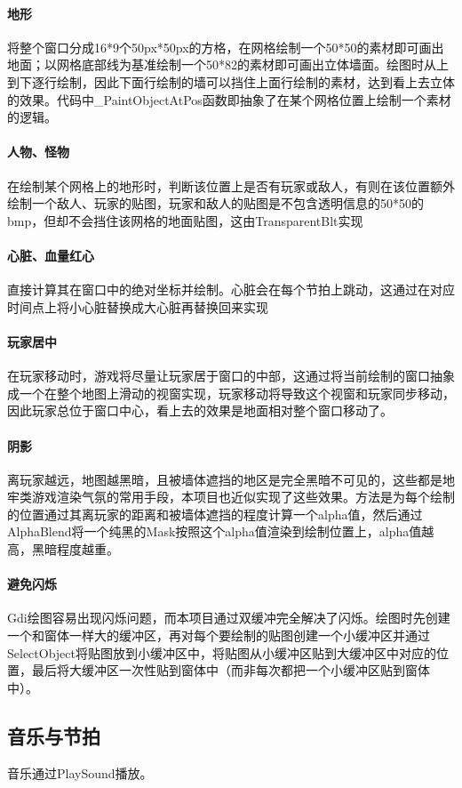 \documentclass[11pt,a4paper]{article}	%
\begin{document}
\paragraph{地形}将整个窗口分成16*9个50px*50px的方格，在网格绘制一个50*50的素材即可画出地面；以网格底部线为基准绘制一个50*82的素材即可画出立体墙面。绘图时从上到下逐行绘制，因此下面行绘制的墙可以挡住上面行绘制的素材，达到看上去立体的效果。代码中\_PaintObjectAtPos函数即抽象了在某个网格位置上绘制一个素材的逻辑。
\paragraph{人物、怪物}在绘制某个网格上的地形时，判断该位置上是否有玩家或敌人，有则在该位置额外绘制一个敌人、玩家的贴图，玩家和敌人的贴图是不包含透明信息的50*50的bmp，但却不会挡住该网格的地面贴图，这由TransparentBlt实现
\paragraph{心脏、血量红心}直接计算其在窗口中的绝对坐标并绘制。心脏会在每个节拍上跳动，这通过在对应时间点上将小心脏替换成大心脏再替换回来实现
\paragraph{玩家居中}在玩家移动时，游戏将尽量让玩家居于窗口的中部，这通过将当前绘制的窗口抽象成一个在整个地图上滑动的视窗实现，玩家移动将导致这个视窗和玩家同步移动，因此玩家总位于窗口中心，看上去的效果是地面相对整个窗口移动了。
\paragraph{阴影}离玩家越远，地图越黑暗，且被墙体遮挡的地区是完全黑暗不可见的，这些都是地牢类游戏渲染气氛的常用手段，本项目也近似实现了这些效果。方法是为每个绘制的位置通过其离玩家的距离和被墙体遮挡的程度计算一个alpha值，然后通过AlphaBlend将一个纯黑的Mask按照这个alpha值渲染到绘制位置上，alpha值越高，黑暗程度越重。
\paragraph{避免闪烁}Gdi绘图容易出现闪烁问题，而本项目通过双缓冲完全解决了闪烁。绘图时先创建一个和窗体一样大的缓冲区，再对每个要绘制的贴图创建一个小缓冲区并通过SelectObject将贴图放到小缓冲区中，将贴图从小缓冲区贴到大缓冲区中对应的位置，最后将大缓冲区一次性贴到窗体中（而非每次都把一个小缓冲区贴到窗体中）。
\subsection{音乐与节拍}
音乐通过PlaySound播放。
\end{document}
